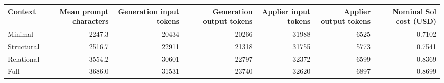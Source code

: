 \begin{tabular}{lrrrrrr}
\toprule
Context & Mean prompt characters & Generation input tokens & Generation output tokens & Applier input tokens & Applier output tokens & Nominal Sol cost (USD) \\
\midrule
Minimal & 2247.3 & 20434 & 20266 & 31988 & 6525 & 0.7102 \\
Structural & 2516.7 & 22911 & 21318 & 31755 & 5773 & 0.7541 \\
Relational & 3554.2 & 30601 & 22797 & 32372 & 6599 & 0.8369 \\
Full & 3686.0 & 31531 & 23740 & 32620 & 6897 & 0.8699 \\
\bottomrule
\end{tabular}
